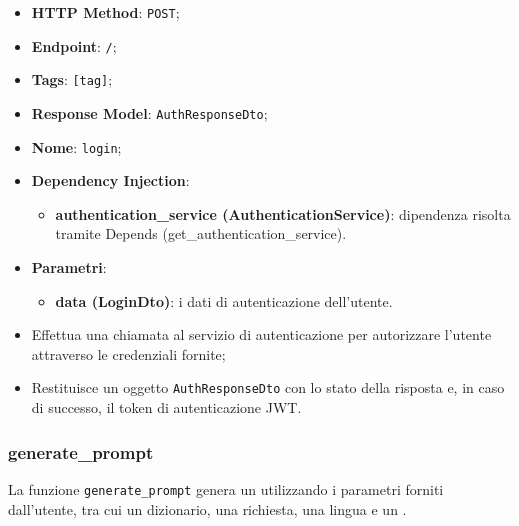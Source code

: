 \begin{itemize}
  \item \textbf{HTTP Method}: \texttt{POST};
  \item \textbf{Endpoint}: \texttt{/};
  \item \textbf{Tags}: \texttt{[tag]};
  \item \textbf{Response Model}: \texttt{AuthResponseDto};
  \item \textbf{Nome}: \texttt{login};
  \item \textbf{Dependency Injection}:
  \begin{itemize}
  \item \textbf{authentication\_service (AuthenticationService)}: dipendenza risolta tramite Depends (get\_authentication\_service).
  \end{itemize}
  \item \textbf{Parametri}:
  \begin{itemize}
    \item \textbf{data (LoginDto)}: i dati di autenticazione dell'utente.
  \end{itemize}
\end{itemize}

\begin{itemize}
  \item Effettua una chiamata al servizio di autenticazione per autorizzare l'utente attraverso le credenziali fornite;
  \item Restituisce un oggetto \texttt{AuthResponseDto} con lo stato della risposta e, in caso di successo, il token di autenticazione JWT.
\end{itemize}



\subsubsection{generate\_prompt}

\par La funzione \texttt{generate\_prompt} genera un  utilizzando i parametri forniti dall'utente, tra cui un dizionario, una richiesta, una lingua e un .


